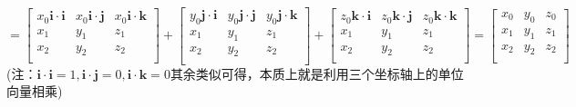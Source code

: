 \begin{equation}
	\nonumber
	=\begin{bmatrix}
		x_0\boldsymbol{i}\cdot\boldsymbol{i} & x_0\boldsymbol{i}\cdot\boldsymbol{j} & x_0\boldsymbol{i}\cdot\boldsymbol{k}\\
	x_1 & y_1 & z_1\\
	x_2 & y_2 & z_2\\
	\end{bmatrix}+
\begin{bmatrix}
	y_0\boldsymbol{j}\cdot\boldsymbol{i} & y_0\boldsymbol{j}\cdot\boldsymbol{j} & y_0\boldsymbol{j}\cdot\boldsymbol{k}\\
	x_1 & y_1 & z_1\\
	x_2 & y_2 & z_2\\
\end{bmatrix}+
\begin{bmatrix}
	z_0\boldsymbol{k}\cdot\boldsymbol{i} & z_0\boldsymbol{k}\cdot\boldsymbol{j} & z_0\boldsymbol{k}\cdot\boldsymbol{k}\\
	x_1 & y_1 & z_1\\
	x_2 & y_2 & z_2\\
\end{bmatrix}=
\begin{bmatrix}
	x_0 & y_0 & z_0\\
	x_1 & y_1 & z_1\\
	x_2 & y_2 & z_2\\
\end{bmatrix}
\end{equation}
(注：$\boldsymbol{i}\cdot\boldsymbol{i}=1,\boldsymbol{i}\cdot\boldsymbol{j}=0,\boldsymbol{i}\cdot\boldsymbol{k}=0$其余类似可得，本质上就是利用三个坐标轴上的单位向量相乘)
